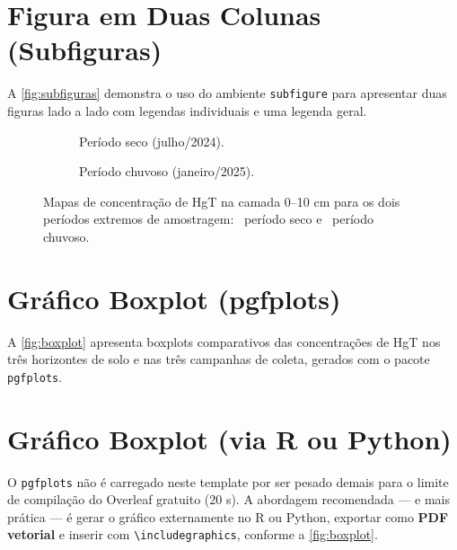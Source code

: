 \section{Figura em Duas Colunas (Subfiguras)}

A \autoref{fig:subfiguras} demonstra o uso do ambiente
\texttt{subfigure} para apresentar duas figuras lado a lado com
legendas individuais e uma legenda geral.

\begin{figure}[htb]
  \centering
  \begin{subfigure}[b]{0.48\textwidth}
    \centering
    \fbox{\rule{0pt}{4.5cm}\rule{\linewidth}{0pt}}
    \caption{Período seco (julho/2024).}
    \label{fig:subfig-seca}
  \end{subfigure}
  \hfill
  \begin{subfigure}[b]{0.48\textwidth}
    \centering
    \fbox{\rule{0pt}{4.5cm}\rule{\linewidth}{0pt}}
    \caption{Período chuvoso (janeiro/2025).}
    \label{fig:subfig-chuva}
  \end{subfigure}
  \caption{Mapas de concentração de HgT na camada 0--10 cm
           para os dois períodos extremos de amostragem:
           ~período seco e
           ~período chuvoso.}
  \label{fig:subfiguras}
\end{figure}

\section{Gráfico Boxplot (pgfplots)}

A \autoref{fig:boxplot} apresenta boxplots comparativos das
concentrações de HgT nos três horizontes de solo e nas três
campanhas de coleta, gerados com o pacote \texttt{pgfplots}.

\section{Gráfico Boxplot (via R ou Python)}

O \texttt{pgfplots} não é carregado neste template por ser pesado
demais para o limite de compilação do Overleaf gratuito (20 s).
A abordagem recomendada — e mais prática — é gerar o gráfico
externamente no R ou Python, exportar como \textbf{PDF vetorial}
e inserir com \verb|\includegraphics|, conforme a
\autoref{fig:boxplot}.


